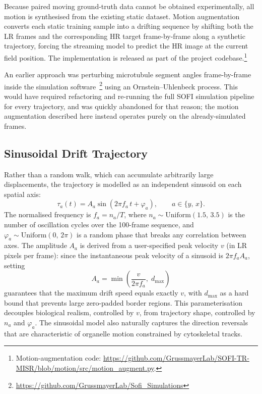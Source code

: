 Because paired moving ground-truth data cannot be obtained experimentally, all
motion is synthesised from the existing static dataset.
Motion augmentation converts each static training sample into a drifting sequence
by shifting both the LR frames and the corresponding HR target frame-by-frame
along a synthetic trajectory, forcing the streaming model to predict the HR image
at the current field position.
The implementation is released as part of the
project codebase.\footnote{Motion-augmentation code:
\url{https://github.com/GrussmayerLab/SOFI-TR-MISR/blob/motion/src/motion_augment.py}.}

An earlier approach was perturbing microtubule segment angles frame-by-frame
inside the simulation software~\footnote{\url{https://github.com/GrussmayerLab/Sofi_Simulations}}
using an Ornstein--Uhlenbeck process. This would have required refactoring and
re-running the full SOFI simulation pipeline for every trajectory, and was quickly
abandoned for that reason; the motion augmentation described here instead operates
purely on the already-simulated frames.

\subsection{Sinusoidal Drift Trajectory}
\label{sec:trajectory_gen}

Rather than a random walk, which can accumulate arbitrarily large displacements,
the trajectory is modelled as an independent sinusoid on each spatial axis:
%
\begin{equation}
  \tau_a(t) = A_a \sin\!\left(2\pi f_a\,t + \varphi_a\right), \qquad a \in \{y,\,x\}.
  \label{eq:sinusoid}
\end{equation}
%
The normalised frequency is $f_a = n_a / T$, where
$n_a \sim \mathrm{Uniform}(1.5,\,3.5)$ is the number of oscillation cycles over the
100-frame sequence, and $\varphi_a \sim \mathrm{Uniform}(0,\,2\pi)$ is a random phase
that breaks any correlation between axes.
The amplitude $A_a$ is derived from a user-specified peak velocity $v$
(in LR pixels per frame): since the instantaneous peak velocity of a sinusoid is
$2\pi f_a A_a$, setting
%
\begin{equation}
  A_a = \min\!\left(\frac{v}{2\pi f_a},\;d_{\max}\right)
  \label{eq:amplitude}
\end{equation}
%
guarantees that the maximum drift speed equals exactly $v$, with $d_{\max}$ as a
hard bound that prevents large zero-padded border regions.
This parameterisation decouples biological realism, controlled by $v$, from
trajectory shape, controlled by $n_a$ and $\varphi_a$.
The sinusoidal model also naturally captures the direction reversals that
are characteristic of organelle motion constrained by cytoskeletal tracks.


